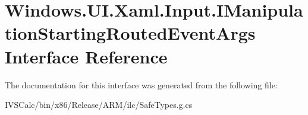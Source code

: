 \hypertarget{interface_windows_1_1_u_i_1_1_xaml_1_1_input_1_1_i_manipulation_starting_routed_event_args}{}\section{Windows.\+U\+I.\+Xaml.\+Input.\+I\+Manipulation\+Starting\+Routed\+Event\+Args Interface Reference}
\label{interface_windows_1_1_u_i_1_1_xaml_1_1_input_1_1_i_manipulation_starting_routed_event_args}


The documentation for this interface was generated from the following file\+:\begin{DoxyCompactItemize}
\item 
I\+V\+S\+Calc/bin/x86/\+Release/\+A\+R\+M/ilc/Safe\+Types.\+g.\+cs\end{DoxyCompactItemize}
